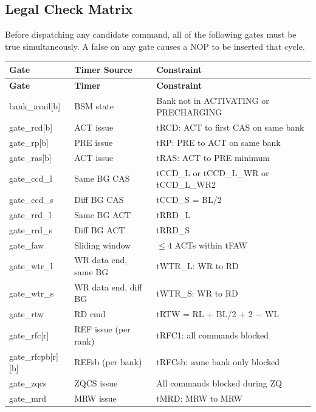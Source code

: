 \documentclass[11pt,a4paper]{article}
\begin{document}
\subsection{Legal Check Matrix}

Before dispatching any candidate command, all of the following gates must be
true simultaneously. A false on any gate causes a NOP to be inserted that cycle.

\begin{longtable}{L{3.5cm} L{3.5cm} L{7.5cm}}
\toprule
\textbf{Gate} & \textbf{Timer Source} & \textbf{Constraint} \\
\midrule
\endfirsthead\toprule\textbf{Gate}&\textbf{Timer}&\textbf{Constraint}\\\midrule\endhead
\bottomrule\endfoot
{}
bank\_avail[b]    & BSM state       & Bank not in ACTIVATING or PRECHARGING \\
gate\_rcd[b]      & ACT issue       & tRCD: ACT to first CAS on same bank \\
gate\_rp[b]       & PRE issue       & tRP: PRE to ACT on same bank \\
gate\_ras[b]      & ACT issue       & tRAS: ACT to PRE minimum \\
gate\_ccd\_l      & Same BG CAS     & tCCD\_L or tCCD\_L\_WR or tCCD\_L\_WR2 \\
gate\_ccd\_s      & Diff BG CAS     & tCCD\_S = BL/2 \\
gate\_rrd\_l      & Same BG ACT     & tRRD\_L \\
gate\_rrd\_s      & Diff BG ACT     & tRRD\_S \\
gate\_faw         & Sliding window  & $\leq 4$ ACTs within tFAW \\
gate\_wtr\_l      & WR data end, same BG & tWTR\_L: WR to RD \\
gate\_wtr\_s      & WR data end, diff BG & tWTR\_S: WR to RD \\
gate\_rtw         & RD cmd          & tRTW = RL + BL/2 + 2 $-$ WL \\
gate\_rfc[r]      & REF issue (per rank)    & tRFC1: all commands blocked \\
gate\_rfcpb[r][b] & REFsb (per bank)        & tRFCsb: same bank only blocked \\
gate\_zqcs        & ZQCS issue      & All commands blocked during ZQ \\
gate\_mrd         & MRW issue       & tMRD: MRW to MRW \\
\end{longtable}
\end{document}
